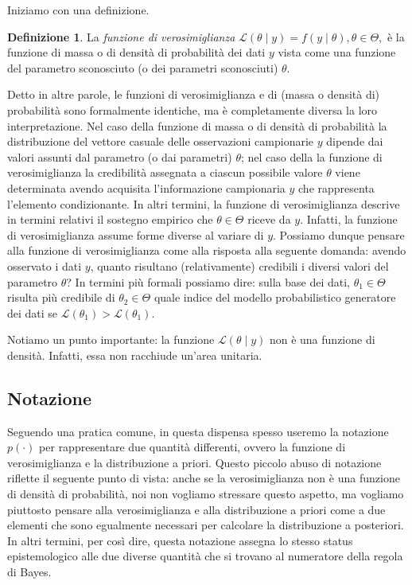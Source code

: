 \documentclass[
  11pt,
]{krantz}
\theoremstyle{definition}
\newtheorem{definition}{Definizione}[chapter]
\theoremstyle{definition}
\theoremstyle{definition}
\theoremstyle{definition}
\theoremstyle{remark}
\begin{document}
Iniziamo con una definizione.

\begin{definition}
La \emph{funzione di verosimiglianza} \(\mathcal{L}(\theta \mid y) = f(y \mid \theta), \theta \in \Theta,\) è la funzione di massa o di densità di probabilità dei dati \(y\) vista come una funzione del parametro sconosciuto (o dei parametri sconosciuti) \(\theta\).
\end{definition}

Detto in altre parole, le funzioni di verosimiglianza e di (massa o densità di) probabilità sono formalmente identiche, ma è completamente diversa la loro interpretazione. Nel caso della funzione di massa o di densità di probabilità la distribuzione del vettore casuale delle osservazioni campionarie \(y\) dipende dai valori assunti dal parametro (o dai parametri) \(\theta\); nel caso della la funzione di verosimiglianza la credibilità assegnata a ciascun possibile valore \(\theta\) viene determinata avendo acquisita l'informazione campionaria \(y\) che rappresenta l'elemento condizionante. In altri termini, la funzione di verosimiglianza descrive in termini relativi il sostegno empirico che \(\theta \in \Theta\) riceve da \(y\). Infatti, la funzione di verosimiglianza assume forme diverse al variare di \(y\). Possiamo dunque pensare alla funzione di verosimiglianza come alla risposta alla seguente domanda: avendo osservato i dati \(y\), quanto risultano (relativamente) credibili i diversi valori del parametro \(\theta\)? In termini più formali possiamo dire: sulla base dei dati, \(\theta_1 \in \Theta\) risulta più credibile di \(\theta_2 \in \Theta\) quale indice del modello probabilistico generatore dei dati se \(\mathcal{L}(\theta_1) > \mathcal{L}(\theta_1)\).

Notiamo un punto importante: la funzione \(\mathcal{L}(\theta \mid y)\) non è una funzione di densità. Infatti, essa non racchiude un'area unitaria.

\hypertarget{notazione-1}{%
\subsection{Notazione}\label{notazione-1}}

Seguendo una pratica comune, in questa dispensa spesso useremo la notazione \(p(\cdot)\) per rappresentare due quantità differenti, ovvero la funzione di verosimiglianza e la distribuzione a priori. Questo piccolo abuso di notazione riflette il seguente punto di vista: anche se la verosimiglianza non è una funzione di densità di probabilità, noi non vogliamo stressare questo aspetto, ma vogliamo piuttosto pensare alla verosimiglianza e alla distribuzione a priori come a due elementi che sono egualmente necessari per calcolare la distribuzione a posteriori. In altri termini, per così dire, questa notazione assegna lo stesso status epistemologico alle due diverse quantità che si trovano al numeratore della regola di Bayes.
\end{document}
